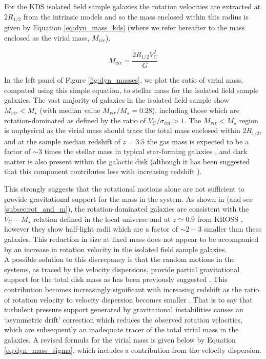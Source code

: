 \documentclass[fleqn,usenatbib]{mnras}
\begin{document}
\noindent
For the KDS isolated field sample galaxies the rotation velocities are extracted at $2R_{1/2}$ from the intrinsic models and so the mass enclosed within this radius is given by Equation \ref{eq:dyn_mass_kds} (where we refer hereafter to the mass enclosed as the virial mass, $M_{vir}$). 

\begin{equation}\label{eq:dyn_mass_kds}
   M_{vir} = \frac{2R_{1/2}V_{C}^{2}}{G}
\end{equation}

\noindent
In the left panel of Figure \ref{fig:dyn_masses}, we plot the ratio of virial mass, computed using this simple equation, to stellar mass for the isolated field sample galaxies.
The vast majority of galaxies in the isolated field sample show $M_{vir} < M_{\star}$ (with median value $M_{vir}/M_{\star}=0.28$), including those which are rotation-dominated as defined by the ratio of $V_{C}/\sigma_{int} > 1$.
The $M_{vir} < M_{\star}$ region is unphysical as the virial mass should trace the total mass enclosed within $2R_{1/2}$, and at the sample median redshift of $z=3.5$ the gas mass is expected to be a factor of $\sim3$ times the stellar mass in typical star-forming galaxies \citep{Tacconi2013,Tacconi2017}, and dark matter is also present within the galactic disk (although it has been suggested that this component contributes less with increasing redshift \citealt{Ubler2017,Genzel2017,Lang2017}).

This strongly suggests that the rotational motions alone are not sufficient to provide gravitational support for the mass in the system.
As shown in \cite{Turner2017} (and see \cref{subsec:rot_and_m}), the rotation-dominated galaxies are consistent with the $V_{C}-M_{\star}$ relation defined in the local universe and at $z\simeq0.9$ from KROSS \citep{Harrison2017}, however they show half-light radii which are a factor of $\sim2-3$ smaller than these galaxies.
This reduction in size at fixed mass does not appear to be accompanied by an increase in rotation velocity in the isolated field sample galaxies. \\

\noindent
A possible solution to this discrepancy is that the random motions in the systems, as traced by the velocity dispersions, provide partial gravitational support for the total disk mass as has been previously suggested \citep[e.g.][]{Burkert2010,Newman2013,Ubler2017}.
This contribution becomes increasingly significant with increasing redshift as the ratio of rotation velocity to velocity dispersion becomes smaller \citep[e.g.][]{ForsterSchreiber2009,Law2009,Epinat2012,Stott2016} \cite{Turner2017}.
That is to say that turbulent pressure support generated by gravitational instabilities causes an `asymmetric drift' correction \citep[e.g.][]{Burkert2010} which reduces the observed rotation velocities, which are subsequently an inadequate tracer of the total virial mass in the galaxies.
A revised formula for the virial mass is given below by Equation \ref{eq:dyn_mass_sigma}, which includes a contribution from the velocity dispersion.
\end{document}
